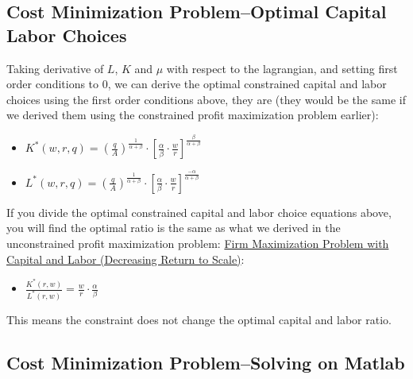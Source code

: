 \documentclass[
]{book}
\providecommand{\tightlist}{%
  \setlength{\itemsep}{0pt}\setlength{\parskip}{0pt}}
\begin{document}
\hypertarget{cost-minimization-problemoptimal-capital-labor-choices}{%
\subsection{Cost Minimization Problem--Optimal Capital Labor Choices}\label{cost-minimization-problemoptimal-capital-labor-choices}}

Taking derivative of \(L\), \(K\) and \(\mu\) with respect to the lagrangian,
and setting first order conditions to \(0\), we can derive the optimal
constrained capital and labor choices using the first order conditions
above, they are (they would be the same if we derived them using the
constrained profit maximization problem earlier):

\begin{itemize}
\item
  \(\displaystyle K^* (w,r,q)={\left(\frac{q}{A}\right)}^{\frac{1}{\alpha +\beta }} \cdot {\left\lbrack \frac{\alpha }{\beta }\cdot \frac{w}{r}\right\rbrack }^{\frac{\beta }{\alpha +\beta }}\)
\item
  \(\displaystyle L^* (w,r,q)={\left(\frac{q}{A}\right)}^{\frac{1}{\alpha +\beta }} \cdot {\left\lbrack \frac{\alpha }{\beta }\cdot \frac{w}{r}\right\rbrack }^{\frac{-\alpha }{\alpha +\beta }}\)
\end{itemize}

If you divide the optimal constrained capital and labor choice equations
above, you will find the optimal ratio is the same as what we derived in
the unconstrained profit maximization problem: \href{https://fanwangecon.github.io/Math4Econ/matrix_application/KL_borrowhire_firm.html}{Firm Maximization
Problem with Capital and Labor (Decreasing Return to
Scale)}:

\begin{itemize}
\tightlist
\item
  \(\displaystyle \frac{K^* (r,w)}{L^* (r,w)}=\frac{w}{r}\cdot \frac{\alpha }{\beta }\)
\end{itemize}

This means the constraint does not change the optimal capital and labor
ratio.

\hypertarget{cost-minimization-problemsolving-on-matlab}{%
\subsection{Cost Minimization Problem--Solving on Matlab}\label{cost-minimization-problemsolving-on-matlab}}
\end{document}
